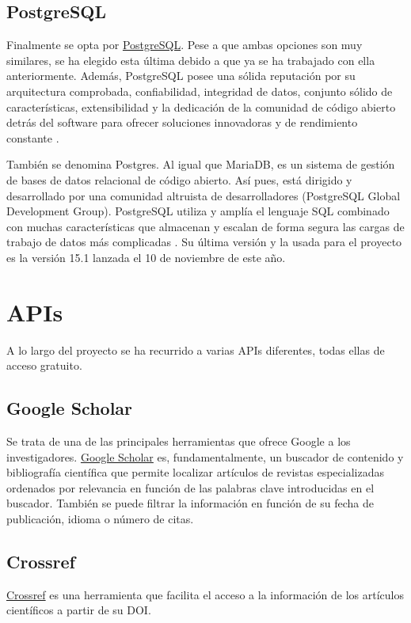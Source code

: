 

\subsection{PostgreSQL}
Finalmente se opta por \href{https://www.postgresql.org/}{PostgreSQL}. Pese a que ambas opciones son muy similares, se ha elegido esta última debido a que ya se ha trabajado con ella anteriormente. Además, PostgreSQL posee una sólida reputación por su arquitectura comprobada, confiabilidad, integridad de datos, conjunto sólido de características, extensibilidad y la dedicación de la comunidad de código abierto detrás del software para ofrecer soluciones innovadoras y de rendimiento constante \cite{Postgresql.org}.


También se denomina Postgres. Al igual que MariaDB, es un sistema de gestión de bases de datos relacional de código abierto. Así pues, está dirigido y desarrollado por una comunidad altruista de desarrolladores (PostgreSQL Global Development Group).
PostgreSQL utiliza y amplía el lenguaje SQL combinado con muchas características que almacenan y escalan de forma segura las cargas de trabajo de datos más complicadas \cite{Postgresql.org}. 
Su última versión y la usada para el proyecto es la versión 15.1 lanzada el 10 de noviembre de este año.



\section{APIs}
A lo largo del proyecto se ha recurrido a varias APIs diferentes, todas ellas de acceso gratuito.

\subsection{Google Scholar}
Se trata de una de las principales herramientas que ofrece Google a los investigadores. \href{https://scholar.google.com/}{Google Scholar} es, fundamentalmente, un buscador de contenido y bibliografía científica que permite localizar artículos de revistas especializadas ordenados por relevancia en función de las palabras clave introducidas en el buscador. También se puede  filtrar la información en función de su fecha de publicación, idioma o número de citas.


\subsection{Crossref}
\href{https://www.crossref.org/}{Crossref} es una herramienta que facilita el  acceso a la información de los artículos científicos a partir de su DOI.


